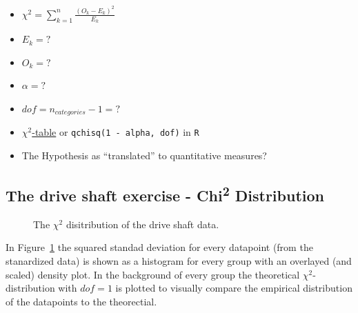 \documentclass[
  a4paper,
]{scrbook}
\providecommand{\tightlist}{%
  \setlength{\itemsep}{0pt}\setlength{\parskip}{0pt}}\usepackage{longtable,booktabs,array}
\begin{document}
\begin{itemize}
\tightlist
\item
  \(\chi^2 = \sum_{k = 1}^n \frac{(O_k - E_k)^2}{E_k}\)
\item
  \(E_k = ?\)
\item
  \(O_k = ?\)
\item
  \(\alpha = ?\)
\item
  \(dof = n_{categories}-1 = ?\)
\item
  \href{https://datatab.net/tutorial/chi-square-distribution}{\(\chi^2\)-table}
  or \texttt{qchisq(1\ -\ alpha,\ dof)} in \texttt{R}
\item
  The Hypothesis as ``translated'' to quantitative measures?
\end{itemize}

\subsection{\texorpdfstring{The drive shaft exercise -
Chi\textsuperscript{2}
Distribution}{The drive shaft exercise - Chi2 Distribution}}\label{the-drive-shaft-exercise---chi2-distribution}

\begin{figure}[ht]


\caption{\label{fig-ds-chi}The \(\chi^2\) disitribution of the drive
shaft data.}

\end{figure}%

In Figure~\ref{fig-ds-chi} the squared standad deviation for every
datapoint (from the stanardized data) is shown as a histogram for every
group with an overlayed (and scaled) density plot. In the background of
every group the theoretical \(\chi^2\)-distribution with \(dof = 1\) is
plotted to visually compare the empirical distribution of the datapoints
to the theorectial.
\end{document}
